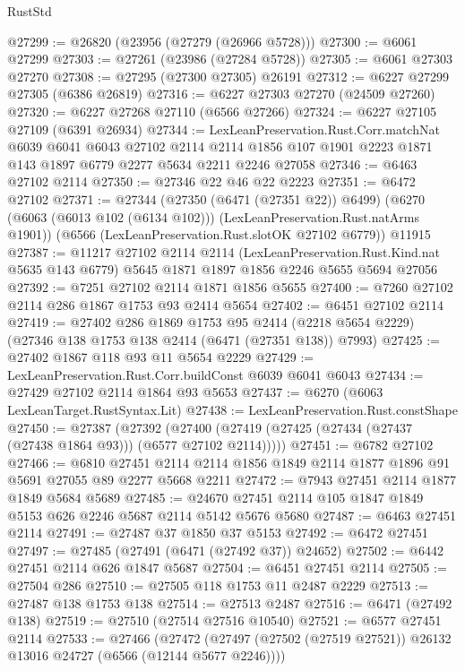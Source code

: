 \begin{lexlean}{RustStd}
\begin{coremodule}
{\begin{coremodule}
{{{{{{{{{{{{{{{{{{{{{{{{{{@27299 := @26820 (@23956 (@27279 (@26966 @5728)))
@27300 := @6061 @27299
@27303 := @27261 (@23986 (@27284 @5728))
@27305 := @6061 @27303 @27270
@27308 := @27295 (@27300 @27305) @26191
@27312 := @6227 @27299 @27305 (@6386 @26819)
@27316 := @6227 @27303 @27270 (@24509 @27260)
@27320 := @6227 @27268 @27110 (@6566 @27266)
@27324 := @6227 @27105 @27109 (@6391 @26934)
@27344 := LexLeanPreservation.Rust.Corr.matchNat
    @6039
    @6041
    @6043
    @27102
    @2114
    @2114
    @1856
    @107
    @1901
    @2223
    @1871
    @143
    @1897
    @6779
    @2277
    @5634
    @2211
    @2246
    @27058
@27346 := @6463 @27102 @2114
@27350 := @27346 @22 @46 @22 @2223
@27351 := @6472 @27102
@27371 := @27344
    (@27350 (@6471 (@27351 @22)) @6499)
    (@6270 (@6063 (@6013 @102 (@6134 @102))) (LexLeanPreservation.Rust.natArms @1901))
    (@6566 (LexLeanPreservation.Rust.slotOK @27102 @6779))
    @11915
@27387 := @11217
    @27102
    @2114
    @2114
    (LexLeanPreservation.Rust.Kind.nat @5635 @143 @6779)
    @5645
    @1871
    @1897
    @1856
    @2246
    @5655
    @5694
    @27056
@27392 := @7251 @27102 @2114 @1871 @1856 @5655
@27400 := @7260 @27102 @2114 @286 @1867 @1753 @93 @2414 @5654
@27402 := @6451 @27102 @2114
@27419 := @27402
    @286
    @1869
    @1753
    @95
    @2414
    (@2218 @5654 @2229)
    (@27346 @138 @1753 @138 @2414 (@6471 (@27351 @138)) @7993)
@27425 := @27402 @1867 @118 @93 @11 @5654 @2229
@27429 := LexLeanPreservation.Rust.Corr.buildConst @6039 @6041 @6043
@27434 := @27429 @27102 @2114 @1864 @93 @5653
@27437 := @6270 (@6063 LexLeanTarget.RustSyntax.Lit)
@27438 := LexLeanPreservation.Rust.constShape
@27450 := @27387
    (@27392 (@27400 (@27419 (@27425 (@27434 (@27437 (@27438 @1864 @93))) (@6577 @27102 @2114)))))
@27451 := @6782 @27102
@27466 := @6810
    @27451
    @2114
    @2114
    @1856
    @1849
    @2114
    @1877
    @1896
    @91
    @5691
    @27055
    @89
    @2277
    @5668
    @2211
@27472 := @7943 @27451 @2114 @1877 @1849 @5684 @5689
@27485 := @24670 @27451 @2114 @105 @1847 @1849 @5153 @626 @2246 @5687 @2114 @5142 @5676 @5680
@27487 := @6463 @27451 @2114
@27491 := @27487 @37 @1850 @37 @5153
@27492 := @6472 @27451
@27497 := @27485 (@27491 (@6471 (@27492 @37)) @24652)
@27502 := @6442 @27451 @2114 @626 @1847 @5687
@27504 := @6451 @27451 @2114
@27505 := @27504 @286
@27510 := @27505 @118 @1753 @11 @2487 @2229
@27513 := @27487 @138 @1753 @138
@27514 := @27513 @2487
@27516 := @6471 (@27492 @138)
@27519 := @27510 (@27514 @27516 @10540)
@27521 := @6577 @27451 @2114
@27533 := @27466
    (@27472 (@27497 (@27502 (@27519 @27521)) @26132 @13016 @24727 (@6566 (@12144 @5677 @2246))))
}}}}}}}}}}}}}}}}}}}}}}}}}}
\end{coremodule}}
\end{coremodule}
\end{lexlean}
